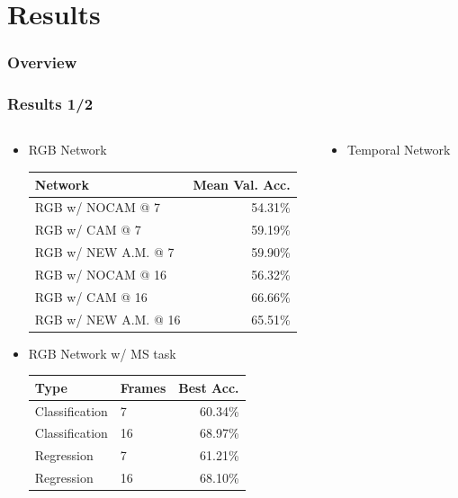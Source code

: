 \documentclass{beamer}
\begin{document}
\section{Results}

\begin{frame}
\frametitle{Overview} 
	\tableofcontents[currentsection]
\end{frame}

\begin{frame}
\frametitle{Results 1/2}

	{ \footnotesize 
	\begin{columns}[c]
		\begin{column}{.65\textwidth}
			\begin{itemize}
				\item RGB Network \\
				\vspace*{8pt}
				\begin{tabular}{l|r}
					Network & Mean Val. Acc. \\
					\hline
					RGB w/ NOCAM @ 7 & 54.31\% \\
					RGB w/ CAM @ 7 & 59.19\% \\
					RGB w/ NEW A.M. @ 7 & 59.90\% \\
					\hline
					RGB w/ NOCAM @ 16 & 56.32\% \\
					RGB w/ CAM @ 16 & 66.66\% \\
					RGB w/ NEW A.M. @ 16 & 65.51\% \\
				\end{tabular}
			\item RGB Network w/ MS task \\
			\vspace*{8pt}
			\begin{tabular}{ll|r}
				Type & Frames & Best Acc. \\
				\hline
				Classification & 7 & 60.34\% \\
				Classification & 16 & 68.97\% \\
				Regression & 7 & 61.21\% \\
				Regression & 16 & 68.10\% \\
			\end{tabular}
			\end{itemize}
		\end{column}
		\begin{column}{.7\textwidth}
				\begin{itemize}
					\item Temporal Network \\

\end{itemize}
\end{column}
\end{columns}}
\end{frame}
\end{document}
